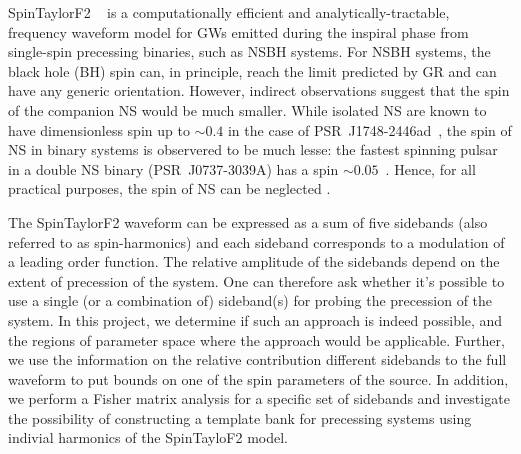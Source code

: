 
SpinTaylorF2 ~\cite{Lundgren2014} is a computationally efficient
and analytically-tractable, frequency waveform model for GWs emitted during
the inspiral phase from single-spin precessing binaries, such as NSBH systems.
For NSBH systems, the black hole (BH) spin can, in principle, reach the limit
predicted by GR and can have any generic orientation. However, indirect
observations suggest that the spin of the companion NS would be much smaller.
While isolated NS are known to have dimensionless spin up to $\sim 0.4$ in the
case of PSR~J1748-2446ad~\cite{PSR2006}, the spin of NS in binary systems is
observered to be much lesse: the fastest spinning pulsar in a double NS
binary (PSR~J0737-3039A) has a spin $\sim 0.05$~\cite{BURGAY2003}. Hence, for
all practical purposes, the spin of NS can be neglected \cite{Lorimer:2008se}.

The SpinTaylorF2 waveform can be expressed as a sum of five sidebands (also
referred to as spin-harmonics) and each sideband corresponds to a modulation
of a leading order function. The relative amplitude of the sidebands depend on
the extent of precession of the system. One can therefore ask whether it's
possible to use a single (or a combination of) sideband(s) for probing the
precession of the system. In this project, we determine if such an approach is
indeed possible, and the regions of parameter space where the approach would
be applicable. Further, we use the information on the relative contribution
different sidebands to the full waveform to put bounds on one of the spin
parameters of the source. In addition, we perform a Fisher matrix analysis for
a specific set of sidebands and investigate the possibility of constructing a
template bank for precessing systems using indivial harmonics of the
SpinTayloF2 model.
